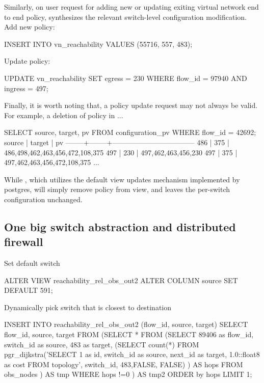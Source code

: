 Similarly, on user request for adding new or updating exiting virtual
network end to end policy, \Sys synthesizes the relevant switch-level
configuration modification.
Add new policy:
\begin{sql}
INSERT INTO vn_reachability VALUES (55716, 557, 483);  
\end{sql}

Update policy:
\begin{sql}
UPDATE vn_reachability SET egress = 230
        WHERE flow_id = 97940 AND ingress = 497;  
\end{sql}

Finally, it is worth noting that, a policy update request may not
always be valid. For example, a deletion of policy  in ... 

\begin{sql}
SELECT source, target, pv FROM configuration_pv WHERE flow_id = 42692;
 source | target |                pv                 
--------+--------+-----------------------------------
    486 |    375 | {486,498,462,463,456,472,108,375}
    497 |    230 | {497,462,463,456,230}
    497 |    375 | {497,462,463,456,472,108,375}
    ...
\end{sql}

While \Sys, which utilizes the default view updates mechanism
implemented by postgres, will simply remove policy  from  view, and leaves the per-switch
configuration unchanged. 

\subsection{One big switch abstraction and distributed firewall}

Set default switch 
\begin{sql}
ALTER VIEW reachability_rel_obs_out2 ALTER COLUMN source SET DEFAULT 591;  
\end{sql}


Dynamically pick switch that is closest to destination
\begin{sql}
INSERT INTO reachability_rel_obs_out2  (flow_id, source, target)
SELECT flow_id, source, target FROM
       (SELECT * FROM
       	       (SELECT 89406 as flow_id,
	       	       switch_id as source,
	       	       483 as target, 
		       (SELECT count(*) FROM
		        pgr_dijkstra('SELECT 1 as id, switch_id as source,
					     next_id as target,
					     1.0::float8 as cost
			              FROM topology', switch_id, 483,FALSE, FALSE)
                       ) AS hops 
                FROM obs_nodes
	       ) AS tmp WHERE hops !=0
       ) AS tmp2 ORDER by hops LIMIT 1;  
\end{sql}
